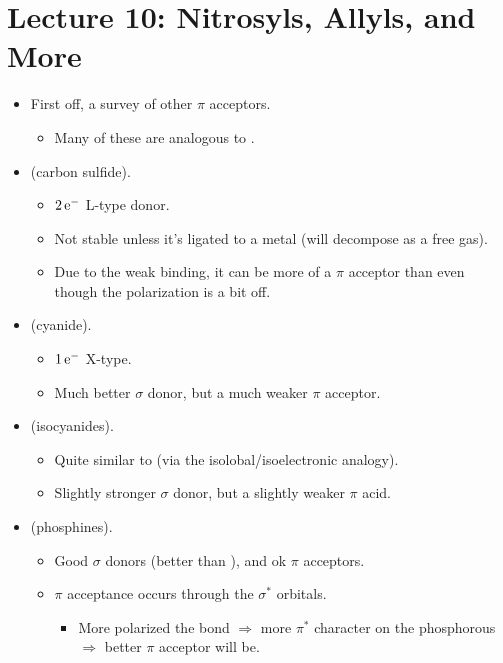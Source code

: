 \documentclass[../notes.tex]{subfiles}
\begin{document}
\section{Lecture 10: Nitrosyls, Allyls, and More}
\begin{itemize}
    \item {}First off, a survey of other $\pi$ acceptors.
    \begin{itemize}
        \item Many of these are analogous to .
    \end{itemize}
    \item {} (carbon sulfide).
    \begin{itemize}
        \item $2\,\e[-]$ L-type donor.
        \item Not stable unless it's ligated to a metal (will decompose as a free gas).
        \item Due to the weak  binding, it can be more of a $\pi$ acceptor than  even though the polarization is a bit off.
    \end{itemize}
    \item \ce{[C#N]-} (cyanide).
    \begin{itemize}
        \item $1\,\e[-]$ X-type.
        \item Much better $\sigma$ donor, but a much weaker $\pi$ acceptor.
    \end{itemize}
    \item {} (isocyanides).
    \begin{itemize}
        \item Quite similar to  (via the isolobal/isoelectronic analogy).
        \item Slightly stronger $\sigma$ donor, but a slightly weaker $\pi$ acid.
    \end{itemize}
    \item {} (phosphines).
    \begin{itemize}
        \item Good $\sigma$ donors (better than ), and ok $\pi$ acceptors.
        \item $\pi$ acceptance occurs through the $\sigma^*$ orbitals.
        \begin{itemize}
            \item More polarized the  bond $\Rightarrow$ more $\pi^*$ character on the phosphorous $\Rightarrow$ better $\pi$ acceptor  will be.

\end{itemize}
\end{itemize}
\end{itemize}
\end{document}
